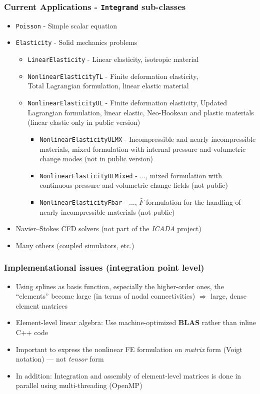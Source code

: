 \documentclass{beamer}
\def\classitem#1{\item{\color{red}\tt#1} -}
\begin{document}
\frame %
{
 \frametitle{Current Applications - {\color{red}\tt Integrand} sub-classes}

 \small
 \begin{itemize}
  \classitem{Poisson} Simple scalar equation

  \pause
  \classitem{Elasticity} Solid mechanics problems
  \begin{itemize}
   \classitem{LinearElasticity} Linear elasticity, isotropic material
   \classitem{NonlinearElasticityTL} Finite deformation elasticity, \\
    Total Lagrangian formulation, linear elastic material
   \classitem{NonlinearElasticityUL} Finite deformation elasticity,
    Updated Lagrangian formulation, linear elastic, Neo-Hookean and
    plastic materials (linear elastic only in public version)
   \pause
   \begin{itemize}
    \classitem{NonlinearElasticityULMX} Incompressible and nearly incompressible
     materials, mixed formulation with internal pressure and volumetric change
     modes (not in public version)
    \classitem{NonlinearElasticityULMixed} ...,
     mixed formulation with continuous pressure and volumetric change fields
     (not public) \\
    \classitem{NonlinearElasticityFbar} ...,
     $\bar{F}$-formulation for the handling of nearly-incompressible materials
     (not public)
   \end{itemize}
  \end{itemize}

  \pause
  \item Navier--Stokes CFD solvers (not part of the {\sl ICADA\/} project)
  \pause
  \item Many others (coupled simulators, etc.)
 \end{itemize}
}

\frame %
{
 \frametitle{Implementational issues (integration point level)}

 \begin{itemize}
  \item<1-> Using splines as basis function, especially the higher-order ones,
            the ``elements'' become large (in terms of nodal connectivities)
            $\Rightarrow$ large, dense element matrices
  \item<2-> Element-level linear algebra: Use machine-optimized {\bf BLAS}
            rather than inline C++ code
  \item<2-> Important to express the nonlinear FE formulation on {\em matrix}
            form (Voigt notation) --- not {\em tensor} form
  \item<3-> In addition: Integration and assembly of element-level matrices
            is done in parallel using multi-threading (OpenMP)
 \end{itemize}
}
\end{document}
